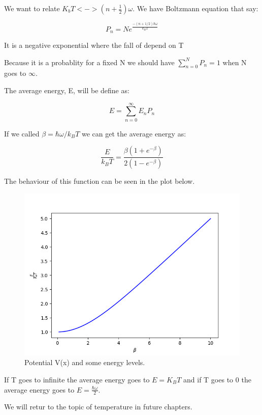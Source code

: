 We want to relate $K_b T <-> \left(n+\frac{1}{2}\right)\omega$. We have Boltzmann equation that say:

\begin{equation}
  P_n = Ne^{\frac{-(n+1/2)\hbar\omega}{k_B T}}
\end{equation}

It is a negative exponential where the fall of depend on T

Because it is a probablity for a fixed N we should have $\sum_{n=0}^{N}P_n = 1$ when N goes to $\infty$.

The average energy, E, will be define as:

\begin{equation}
  E = \sum_{n=0}^{\infty}E_nP_n
\end{equation}

If we called $\beta = \hbar\omega/k_B T$ we can get the average energy as:

\begin{equation}
  \frac{E}{k_B T} = \frac{\beta(1+e^{-\beta})}{2(1-e^{-\beta})}
\end{equation}

The behaviour of this function can be seen in the plot below.


\begin{figure}[H]
  \centering
  \includegraphics{images7/E_beta.png}
  \caption{Potential V(x) and some energy levels.}
\end{figure}

If T goes to infinite the average energy goes to $E=K_BT$ and if T goes to 0 the average energy goes to $E=\frac{\hbar\omega}{2}$.

We will retur to the topic of temperature in future chapters.
